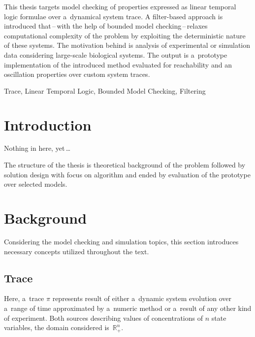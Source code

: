 \documentclass[12pt,twoside,draft]{fithesis}
\newcommand{\mReal}{\mathbb{R}}
\begin{document}
\FrontMatter
\ThesisTitlePage

\begin{ThesisDeclaration}
\DeclarationText
\AdvisorName
\end{ThesisDeclaration}


\begin{ThesisAbstract}
This thesis targets model checking of properties expressed as linear
temporal logic formulae over a~dynamical system trace. A filter-based
approach is introduced that\,--\,with the help of bounded model
checking\,--\,relaxes computational complexity of the problem by
exploiting the deterministic nature of these systems. The motivation
behind is analysis of experimental or simulation data considering
large-scale biological systems.
The output is a~prototype implementation of the introduced method
evaluated for reachability and an oscillation properties over custom
system traces. 
\end{ThesisAbstract}

\begin{ThesisKeyWords}
Trace, Linear Temporal Logic, Bounded Model Checking, Filtering
\end{ThesisKeyWords}

\MainMatter
\tableofcontents
\chapter{Introduction}
Nothing in here, yet\,\dots

The structure of the thesis is theoretical background of the problem
followed by solution design with focus on algorithm and ended by
evaluation of the prototype over selected models.

\chapter{Background}
Considering the model checking and simulation topics, this section
introduces necessary concepts utilized throughout the text.

\section{Trace}
Here, a~trace $\pi$ represents result of either a~dynamic system
evolution over a~range of time\cite{sven,pospisil} approximated by
a~numeric method or a~result of any other kind of experiment.
Both sources describing values of concentrations of $n$ state variables,
the domain considered is~$\mReal_{+}^n$.
\end{document}
